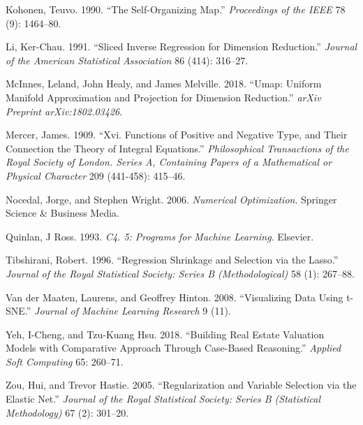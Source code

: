 \documentclass[
]{book}
\newlength{\cslhangindent}
\newlength{\cslentryspacingunit} %
\newenvironment{CSLReferences}[2] %
 {%
  \setlength{\parindent}{0pt}
  \ifodd #1
  \let\oldpar\par
  \def\par{\hangindent=\cslhangindent\oldpar}
  \fi
  \setlength{\parskip}{#2\cslentryspacingunit}
 }%
 {}
\theoremstyle{definition}
\theoremstyle{definition}
\theoremstyle{definition}
\theoremstyle{definition}
\theoremstyle{remark}
\begin{document}
\begin{CSLReferences}{1}{0}
\leavevmode{}%
Kohonen, Teuvo. 1990. {``The Self-Organizing Map.''} \emph{Proceedings of the IEEE} 78 (9): 1464--80.

\leavevmode{}%
Li, Ker-Chau. 1991. {``Sliced Inverse Regression for Dimension Reduction.''} \emph{Journal of the American Statistical Association} 86 (414): 316--27.

\leavevmode{}%
McInnes, Leland, John Healy, and James Melville. 2018. {``Umap: Uniform Manifold Approximation and Projection for Dimension Reduction.''} \emph{arXiv Preprint arXiv:1802.03426}.

\leavevmode{}%
Mercer, James. 1909. {``Xvi. Functions of Positive and Negative Type, and Their Connection the Theory of Integral Equations.''} \emph{Philosophical Transactions of the Royal Society of London. Series A, Containing Papers of a Mathematical or Physical Character} 209 (441-458): 415--46.

\leavevmode{}%
Nocedal, Jorge, and Stephen Wright. 2006. \emph{Numerical Optimization}. Springer Science \& Business Media.

\leavevmode{}%
Quinlan, J Ross. 1993. \emph{C4. 5: Programs for Machine Learning}. Elsevier.

\leavevmode{}%
Tibshirani, Robert. 1996. {``Regression Shrinkage and Selection via the Lasso.''} \emph{Journal of the Royal Statistical Society: Series B (Methodological)} 58 (1): 267--88.

\leavevmode{}%
Van der Maaten, Laurens, and Geoffrey Hinton. 2008. {``Visualizing Data Using t-SNE.''} \emph{Journal of Machine Learning Research} 9 (11).

\leavevmode{}%
Yeh, I-Cheng, and Tzu-Kuang Hsu. 2018. {``Building Real Estate Valuation Models with Comparative Approach Through Case-Based Reasoning.''} \emph{Applied Soft Computing} 65: 260--71.

\leavevmode{}%
Zou, Hui, and Trevor Hastie. 2005. {``Regularization and Variable Selection via the Elastic Net.''} \emph{Journal of the Royal Statistical Society: Series B (Statistical Methodology)} 67 (2): 301--20.

\end{CSLReferences}
\end{document}
